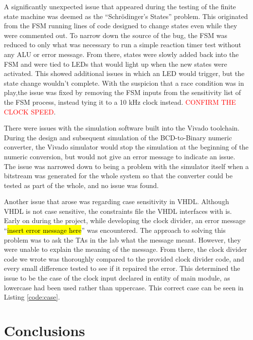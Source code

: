 \documentclass[11pt]{article}
\begin{document}
A significantly unexpected issue that appeared during the testing of the finite state machine was deemed as the ``Schrödinger's States'' problem. This originated from the FSM running lines of code designed to change states even while they were commented out. To narrow down the source of the bug, the FSM was reduced to only what was necessary to run a simple reaction timer test without any ALU or error message. From there, states were slowly added back into the FSM and were tied to LEDs that would light up when the new states were activated. This showed additional issues in which an LED would trigger, but the state change wouldn't complete. With the suspicion that a race condition was in play,the issue was fixed by removing the FSM inputs from the sensitivity list of the FSM process, instead tying it to a 10 kHz clock instead. \textcolor{red}{CONFIRM THE CLOCK SPEED}.

There were issues with the simulation software built into the Vivado toolchain. During the design and subsequent simulation of the BCD-to-Binary numeric converter, the Vivado simulator would stop the simulation at the beginning of the numeric conversion, but would not give an error message to indicate an issue. The issue was narrowed down to being a problem with the simulator itself when a bitstream was generated for the whole system so that the converter could be tested as part of the whole, and no issue was found.

Another issue that arose was regarding case sensitivity in VHDL. Although VHDL is not case sensitive, the constraints file the VHDL interfaces with is. Early on during the project, while developing the clock divider, an error message ``\hl{insert error message here}'' was encountered. The approach to solving this problem was to ask the TAs in the lab what the message meant. However, they were unable to explain the meaning of the message. From there, the clock divider code we wrote was thoroughly compared to the provided clock divider code, and every small difference tested to see if it repaired the error. This determined the issue to be the case of the clock input declared in entity of main module, as lowercase had been used rather than uppercase. This correct case can be seen in Listing \ref{code:case}.

\section{Conclusions}
\end{document}

